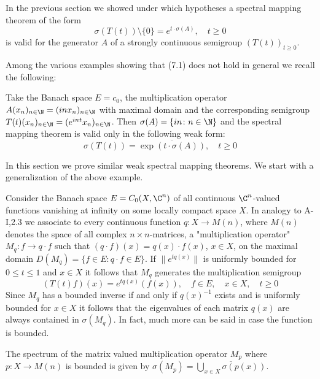 In the previous section we showed under which hypotheses a spectral mapping theorem of the form
\begin{equation}\label{eq:a3-7.1}
\sigma(T(t)) \setminus \{0\} = e^{t \cdot \sigma(A)}, \quad t \geq 0
\end{equation}
is valid for the generator $A$ of a strongly continuous semigroup $(T(t))_{t\geq 0}$.

Among the various examples showing that (7.1) does not hold in general we recall the following:

Take the Banach space $E = c_{0}$, the multiplication operator $A(x_{n})_{n\in\N} = (inx_{n})_{n\in\N}$ with maximal domain and the corresponding semigroup $T(t)(x_{n})_{n\in\N} = (e^{int}x_{n})_{n\in\N}$.
Then $\sigma(A) = \{in \colon n \in \N\}$ and the spectral mapping theorem is valid only in the following weak form:
\begin{equation}\label{eq:a3-7.2}
\sigma(T(t)) = \overline{\exp(t\cdot\sigma(A))}, \quad t \geq 0
\end{equation}

In this section we prove similar weak spectral mapping theorems.
We start with a generalization of the above example.

Consider the Banach space $E = C_{0}(X,\C^{n})$ of all continuous $\C^{n}$-valued functions vanishing at infinity on some locally compact space $X$.
In analogy to A-I,2.3 we associate to every continuous function $q \colon X \to M(n)$, where $M(n)$ denotes the space of all complex $n\times n$-matrices, a "multiplication operator" $M_{q} \colon f \to q\cdot f$ such that $(q\cdot f)(x) = q(x)\cdot f(x)$, $x \in X$, on the maximal domain $D(M_{q}) = \{f \in E \colon q\cdot f \in E\}$.
If $\|e^{tq(x)}\|$ is uniformly bounded for $0 \leq t \leq 1$ and $x \in X$ it follows that $M_{q}$ generates the multiplication semigroup
\[
(T(t)f)(x) = e^{tq(x)}(f(x)), \quad f \in E, \quad x \in X, \quad t \geq 0
\]
Since $M_{q}$ has a bounded inverse if and only if $q(x)^{-1}$ exists and is uniformly bounded for $x \in X$ it follows that the eigenvalues of each matrix $q(x)$ are always contained in $\sigma(M_{q})$.
In fact, much more can be said in case the function is bounded.



\newpage
\begin{lemma}\label{lem:a3-6.1}
The spectrum of the matrix valued multiplication operator $M_{p}$ where $p \colon X \to M(n)$ is bounded is given by $\sigma(M_{p}) = \overline{\bigcup_{x\in X} \sigma(p(x))}$.
\end{lemma}

